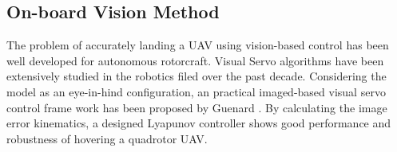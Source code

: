 %
%

\subsection{On-board Vision Method}
The problem of accurately landing a UAV using vision-based control has been well developed for autonomous rotorcraft. Visual Servo algorithms have been extensively studied in the robotics filed over the past decade. Considering the model as an eye-in-hind configuration, an practical imaged-based visual servo control frame work has been proposed by Guenard \cite{Guenard2008}. By calculating the image error kinematics, a designed Lyapunov controller shows good performance and robustness of hovering a quadrotor UAV. 


